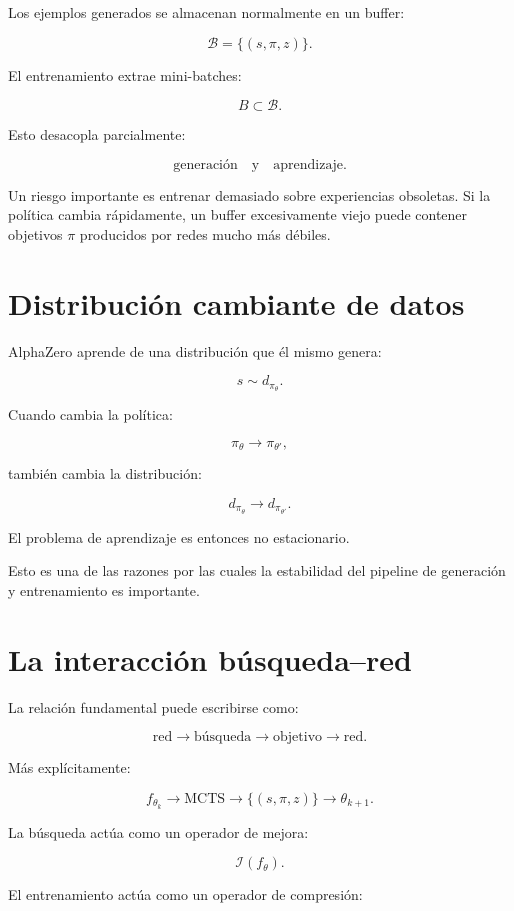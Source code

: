 \documentclass[11pt,a4paper]{article}
\begin{document}
Los ejemplos generados se almacenan normalmente en un buffer:

\[
\mathcal{B}
=
\{(s,\pi,z)\}.
\]

El entrenamiento extrae mini-batches:

\[
B
\subset
\mathcal{B}.
\]

Esto desacopla parcialmente:

\[
\text{generación}
\quad\text{y}\quad
\text{aprendizaje}.
\]

Un riesgo importante es entrenar demasiado sobre experiencias obsoletas. Si la política cambia rápidamente, un buffer excesivamente viejo puede contener objetivos \(\pi\) producidos por redes mucho más débiles.

\section{Distribución cambiante de datos}

AlphaZero aprende de una distribución que él mismo genera:

\[
s
\sim
d_{\pi_\theta}.
\]

Cuando cambia la política:

\[
\pi_\theta
\rightarrow
\pi_{\theta'},
\]

también cambia la distribución:

\[
d_{\pi_\theta}
\rightarrow
d_{\pi_{\theta'}}.
\]

El problema de aprendizaje es entonces no estacionario.

Esto es una de las razones por las cuales la estabilidad del pipeline de generación y entrenamiento es importante.

\section{La interacción búsqueda--red}

La relación fundamental puede escribirse como:

\[
\text{red}
\rightarrow
\text{búsqueda}
\rightarrow
\text{objetivo}
\rightarrow
\text{red}.
\]

Más explícitamente:

\[
f_{\theta_k}
\rightarrow
\mathrm{MCTS}
\rightarrow
\{(s,\pi,z)\}
\rightarrow
\theta_{k+1}.
\]

La búsqueda actúa como un operador de mejora:

\[
\mathcal{I}(f_\theta).
\]

El entrenamiento actúa como un operador de compresión:
\end{document}
